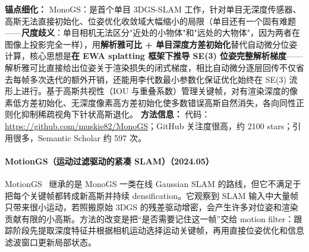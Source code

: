 \textbf{锚点细化：} MonoGS：是首个单目 3DGS-SLAM 工作，针对单目无深度传感器、高斯无法直接初始化、位姿优化收敛域大幅缩小的局限（单目还有一个固有难题——\textbf{尺度歧义}：单目相机无法区分"近处的小物体"和"远处的大物体"，因为两者在图像上投影完全一样），用\textbf{解析雅可比 + 单目深度方差初始化}替代自动微分位姿计算，核心思想是\textbf{在 EWA splatting 框架下推导 SE(3) 位姿完整解析梯度}——解析雅可比直接给出位姿关于渲染损失的闭式梯度，相比自动微分逐层回传不仅省去每帧多次迭代的额外开销，还能用李代数最小参数化保证优化始终在 SE(3) 流形上进行。基于高斯共视性（IOU 与重叠系数）管理关键帧，对有渲染深度的像素低方差初始化、无深度像素高方差初始化使多数错误高斯自然消失，各向同性正则化抑制稀疏视角下针状高斯退化。
\textbf{方法信息：} 代码：\url{https://github.com/muskie82/MonoGS}；GitHub 关注度很高，约 2100 stars；引用很多，Semantic Scholar 约 597 次。



\paragraph{MotionGS（运动过滤驱动的紧凑 SLAM）（2024.05）}
MotionGS~\cite{2405_11129} 继承的是 MonoGS 一类在线 Gaussian SLAM 的路线，但它不满足于把每个关键帧都转成新高斯并持续 densification。它观察到 SLAM 输入中大量帧只带来很小运动，若照搬原始 3DGS 的残差驱动增密，会产生许多对位姿和渲染贡献有限的小高斯。方法的改变是把“是否需要记住这一帧”交给 motion filter：跟踪阶段先提取深度特征并根据相机运动选择运动关键帧，再用直接位姿优化和信息滤波窗口更新局部状态。


